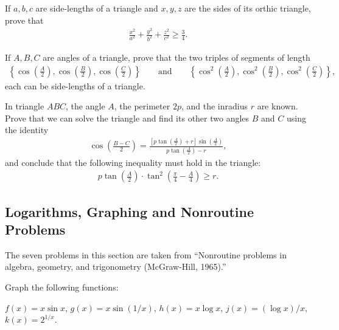 \begin{question}
    If $a,b,c$ are side-lengths of a triangle and $x,y,z$ are the sides of its orthic triangle, prove that
    \begin{align*}
        \frac{x^2}{a^2}+\frac{y^2}{b^2}+\frac{z^2}{c^2} \geq \frac{3}{4}.
    \end{align*}
\end{question}

\begin{question}
    If $A,B,C$ are angles of a triangle, prove that the two triples of segments of length
    \begin{align*}
        \left\{\cos\left(\frac{A}{2}\right), \cos\left(\frac{B}{2}\right), \cos\left(\frac{C}{2}\right)\right\} \qquad \text{and} \qquad \left\{\cos^2\left(\frac{A}{2}\right), \cos^2\left(\frac{B}{2}\right), \cos^2\left(\frac{C}{2}\right)\right\},
    \end{align*}
    each can be side-lengths of a triangle.
\end{question}

\begin{question}
    In triangle $ABC$, the angle $A$, the perimeter $2p$, and the inradius $r$ are known. Prove that we can solve the triangle and find its other two angles $B$ and $C$ using the identity
    \begin{align*}
        \cos\left(\frac{B-C}{2}\right) = \frac{\displaystyle \left[p\tan\left(\frac{A}{2}\right)+r\right]\sin\left(\frac{A}{2}\right)}{\displaystyle p\tan\left(\frac{A}{2}\right)-r},
    \end{align*}
    and conclude that the following inequality must hold in the triangle:
    \begin{align*}
        p\tan\left(\frac{A}{2}\right)\cdot \tan^2\left(\frac{\pi}{4}-\frac{A}{4}\right) \geq r.
    \end{align*}
\end{question}

\subsection{Logarithms, Graphing and Nonroutine Problems}
The seven problems in this section are taken from ``Nonroutine problems in algebra, geometry, and trigonometry (McGraw-Hill, 1965).''

\begin{question}
    Graph the following functions:
    \begin{tasks}
        \task $f(x)=x \sin x$,
        \task $g(x)=x \sin (1/x)$,
        \task $h(x)=x \log x$,
        \task $j(x)=(\log x)/x$,
        \task $k(x)=2^{1/x}$.
    \end{tasks}
\end{question}

